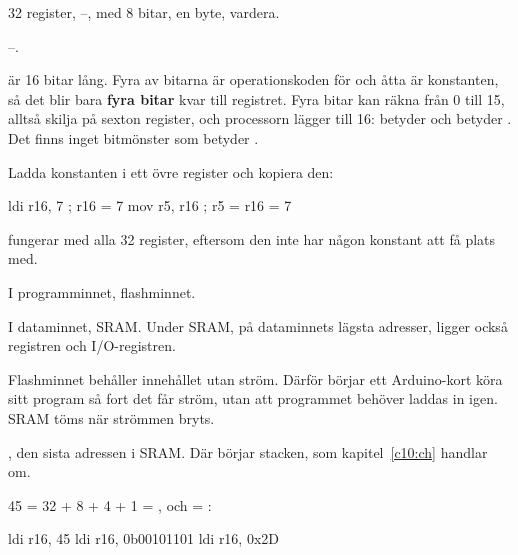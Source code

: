 %


32 register, --, med 8 bitar, en byte, vardera.

--.

 är 16 bitar lång. Fyra av bitarna är operationskoden för  och åtta är
konstanten, så det blir bara \textbf{fyra bitar} kvar till registret. Fyra bitar kan räkna från 0
till 15, alltså skilja på sexton register, och processorn lägger till 16:  betyder
 och  betyder . Det finns inget bitmönster som betyder .

Ladda konstanten i ett övre register och kopiera den:

\begin{asmcode}
    ldi r16, 7                      ; r16 = 7
    mov r5, r16                     ; r5 = r16 = 7
\end{asmcode}

\noindent{} fungerar med alla 32 register, eftersom den inte har någon konstant att få
plats med.

I programminnet, flashminnet.

I dataminnet, SRAM. Under SRAM, på dataminnets lägsta adresser, ligger också registren och
I/O-registren.

Flashminnet behåller innehållet utan ström. Därför börjar ett Arduino-kort köra sitt program
så fort det får ström, utan att programmet behöver laddas in igen. SRAM töms när strömmen bryts.

, den sista adressen i SRAM. Där börjar stacken, som kapitel~\ref{c10:ch}
handlar om.

45 = 32 + 8 + 4 + 1 = , och  = :

\begin{asmcode}
    ldi r16, 45
    ldi r16, 0b00101101
    ldi r16, 0x2D
\end{asmcode}

